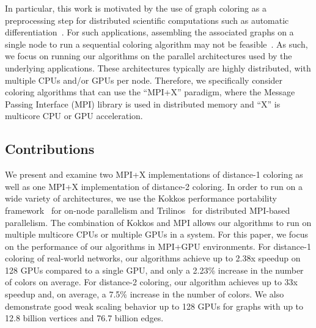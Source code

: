 
In particular, this work is motivated by the use of graph coloring as a preprocessing step for distributed scientific computations such as automatic differentiation~\cite{IAB:gebremedhin2020introduction}. 
For such applications, assembling the associated graphs on a single node to run a sequential coloring algorithm may not be feasible~\cite{IAB:bozdaug2008framework}.
As such, we focus on running our algorithms on the parallel architectures used by the underlying applications.
These architectures typically are highly distributed, with multiple CPUs and/or GPUs per node.
Therefore, we specifically consider coloring algorithms that can use the ``MPI+X'' paradigm, where the Message Passing Interface (MPI) library is used in distributed memory and ``X'' is multicore CPU or GPU acceleration.


\subsection{Contributions}

We present and examine two MPI+X implementations of distance-1 coloring as well as one MPI+X implementation of distance-2 coloring.
In order to run on a wide variety of architectures, we use the Kokkos performance portability framework~\cite{IAB:edwards2014kokkos,kokkoskernels} for on-node parallelism and Trilinos~\cite{IAB:heroux2005overview} for distributed MPI-based parallelism.
The combination of Kokkos and MPI allows our algorithms to run on multiple multicore CPUs or multiple GPUs in a system.
For this paper, we focus on the performance of our algorithms in MPI+GPU environments.
For distance-1 coloring of real-world networks, our algorithms achieve up to 2.38x speedup on 128 GPUs compared to a single GPU, and only a 2.23\% increase in the number of colors on average.
For distance-2 coloring, our algorithm achieves up to 33x speedup and, on average, a 7.5\% increase in the number of colors.
We also demonstrate good weak scaling behavior up to 128 GPUs for graphs with up to 12.8 billion vertices and 76.7 billion edges.

